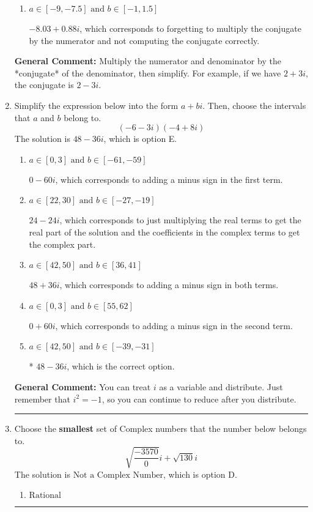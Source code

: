 \documentclass{extbook}[14pt]
\newcommand{\litem}[1]{\item #1

\rule{\textwidth}{0.4pt}}
\begin{document}
\begin{enumerate}
{\begin{enumerate}[label=\Alph*.]
 $-4.50  + 8.25 i$, which corresponds to just dividing the first term by the first term and the second by the second.
\item \( a \in [-9, -7.5] \text{ and } b \in [-1, 1.5] \)

 $-8.03  + 0.88 i$, which corresponds to forgetting to multiply the conjugate by the numerator and not computing the conjugate correctly.
\end{enumerate}

\textbf{General Comment:} Multiply the numerator and denominator by the *conjugate* of the denominator, then simplify. For example, if we have $2+3i$, the conjugate is $2-3i$.
}
\litem{
Simplify the expression below into the form $a+bi$. Then, choose the intervals that $a$ and $b$ belong to.
\[ (-6 - 3 i)(-4 + 8 i) \]
The solution is \( 48 - 36 i \), which is option E.\begin{enumerate}[label=\Alph*.]
\item \( a \in [0, 3] \text{ and } b \in [-61, -59] \)

 $0 - 60 i$, which corresponds to adding a minus sign in the first term.
\item \( a \in [22, 30] \text{ and } b \in [-27, -19] \)

 $24 - 24 i$, which corresponds to just multiplying the real terms to get the real part of the solution and the coefficients in the complex terms to get the complex part.
\item \( a \in [42, 50] \text{ and } b \in [36, 41] \)

 $48 + 36 i$, which corresponds to adding a minus sign in both terms.
\item \( a \in [0, 3] \text{ and } b \in [55, 62] \)

 $0 + 60 i$, which corresponds to adding a minus sign in the second term.
\item \( a \in [42, 50] \text{ and } b \in [-39, -31] \)

* $48 - 36 i$, which is the correct option.
\end{enumerate}

\textbf{General Comment:} You can treat $i$ as a variable and distribute. Just remember that $i^2=-1$, so you can continue to reduce after you distribute.
}
\litem{
Choose the \textbf{smallest} set of Complex numbers that the number below belongs to.
\[ \sqrt{\frac{-3570}{0}} i+\sqrt{130}i \]
The solution is \( \text{Not a Complex Number} \), which is option D.\begin{enumerate}[label=\Alph*.]
\item \( \text{Rational} \)


\end{enumerate}}
\end{enumerate}
\end{document}
